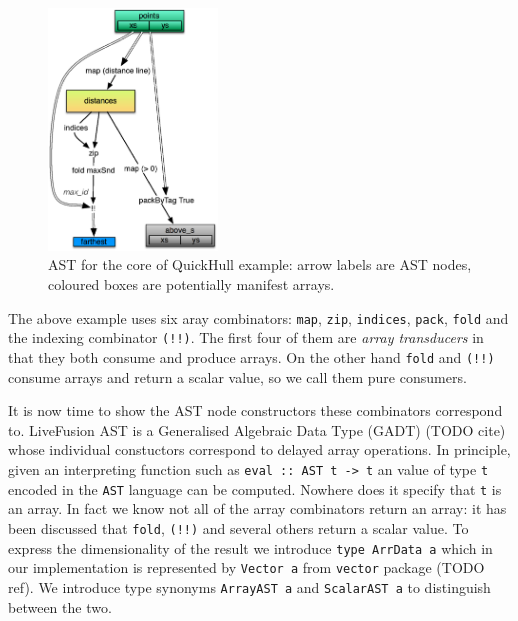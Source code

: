 \documentclass[preamble.tex]{subfiles}
\begin{document}
\begin{figure}
\includegraphics[width=0.4\textwidth,center]{img/QuickHull-flat-but-true}

\caption{\label{fig:QHFlat}{AST for the core of QuickHull example: arrow labels are AST nodes, coloured boxes are potentially manifest arrays.}}
\end{figure}

The above example uses six aray combinators: \texttt{map}, \texttt{zip}, \texttt{indices}, \texttt{pack}, \texttt{fold} and the indexing combinator \texttt{(!!)}. The first four of them are \emph{array transducers} in that they both consume and produce arrays. On the other hand \texttt{fold} and \texttt{(!!)} consume arrays and return a scalar value, so we call them pure consumers.

It is now time to show the AST node constructors these combinators correspond to. LiveFusion AST is a Generalised Algebraic Data Type (GADT) (TODO cite) whose individual constuctors correspond to delayed array operations. In principle, given an interpreting function such as \texttt{eval :: AST t -> t} an value of type \texttt{t} encoded in the \texttt{AST} language can be computed. Nowhere does it specify that \texttt{t} is an array. In fact we know not all of the array combinators return an array: it has been discussed that \texttt{fold}, \texttt{(!!)} and several others return a scalar value. To express the dimensionality of the result we introduce \texttt{type ArrData a} which in our implementation is represented by \texttt{Vector a} from \texttt{vector} package (TODO ref). We introduce type synonyms \texttt{ArrayAST a} and \texttt{ScalarAST a} to distinguish between the two.
\end{document}
